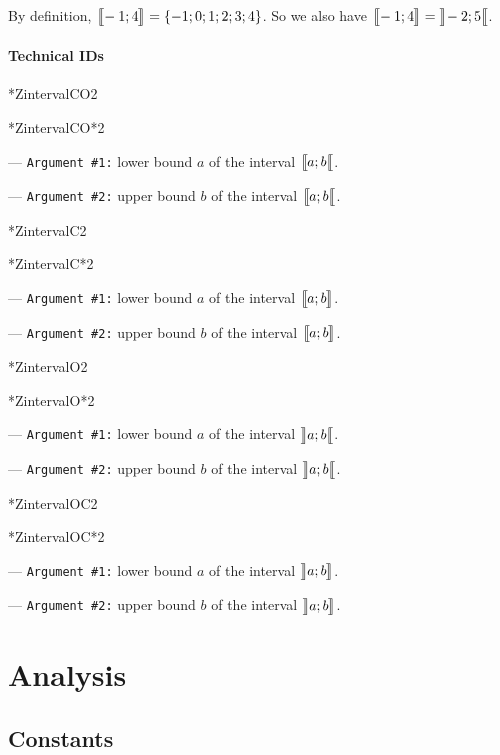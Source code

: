 \documentclass[12pt,a4paper]{article}
\makeatletter
\newcommand\IDmacro{\@ifstar{\@IDmacroStar}{\@IDmacroNoStar}}
\newcommand\@IDmacroNoStar[3]{%
        \texttt{%
        	\textbackslash#1%
        	\IfStrEq{#2}{0}{}{%
        		\,\,[#2 Option%
				\IfStrEq{#2}{1}{}{s}]%
			}%
    	    \,\,(#3 Argument%
				\IfStrEq{#3}{1}{}{s})%
	   	}
        \immediate\write\tempfile{macro@#1@#2@#3}%
    }
\newcommand\@IDmacroStar[2]{%
        \@IDmacroNoStar{#1}{0}{#2}%
    }
\newcommand\@IDoptarg[2]{%
    	\vspace{0.5em}
		--- \texttt{#1 \##2:}%
	}
\newcommand\IDarg[1]{%
    	\@IDoptarg{Argument}{#1}%
	}
\makeatother
\begin{document}
\begin{tcblisting}{}
By definition, $\ZintervalC{-1}{4} = \{ -1 ; 0 ; 1 ; 2 ; 3 ; 4 \}$. So we also have
$\ZintervalC{-1}{4} = \ZintervalO{-2}{5}$.

\end{tcblisting}


		\paragraph{Technical IDs}


\medskip

\IDmacro*{ZintervalCO}{2}

\IDmacro*{ZintervalCO*}{2}

\IDarg{1} lower bound $a$ of the interval $\ZintervalCO{a}{b}$.

\IDarg{2} upper bound $b$ of the interval $\ZintervalCO{a}{b}$.

\medskip

\IDmacro*{ZintervalC}{2}

\IDmacro*{ZintervalC*}{2}

\IDarg{1} lower bound $a$ of the interval $\ZintervalC{a}{b}$.

\IDarg{2} upper bound $b$ of the interval $\ZintervalC{a}{b}$.

\medskip

\IDmacro*{ZintervalO}{2}

\IDmacro*{ZintervalO*}{2}

\IDarg{1} lower bound $a$ of the interval $\ZintervalO{a}{b}$.

\IDarg{2} upper bound $b$ of the interval $\ZintervalO{a}{b}$.

\medskip

\IDmacro*{ZintervalOC}{2}

\IDmacro*{ZintervalOC*}{2}

\IDarg{1} lower bound $a$ of the interval $\ZintervalOC{a}{b}$.

\IDarg{2} upper bound $b$ of the interval $\ZintervalOC{a}{b}$.



\section{Analysis}



\subsection{Constants}
\end{document}
